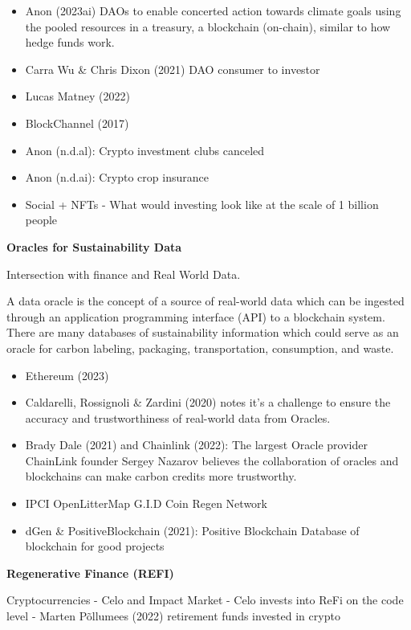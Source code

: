 \documentclass[
  letterpaper,
  DIV=11,
  numbers=noendperiod]{scrartcl}
\begin{document}
\begin{itemize}
\item
  Anon (2023ai) DAOs to enable concerted action towards climate goals
  using the pooled resources in a treasury, a blockchain (on-chain),
  similar to how hedge funds work.
\item
  Carra Wu \& Chris Dixon (2021) DAO consumer to investor
\item
  Lucas Matney (2022)
\item
  BlockChannel (2017)
\item
  Anon (n.d.al): Crypto investment clubs canceled
\item
  Anon (n.d.ai): Crypto crop insurance
\item
  Social + NFTs - What would investing look like at the scale of 1
  billion people
\end{itemize}

\textbf{Oracles for Sustainability Data}

Intersection with finance and Real World Data.

A data oracle is the concept of a source of real-world data which can be
ingested through an application programming interface (API) to a
blockchain system. There are many databases of sustainability
information which could serve as an oracle for carbon labeling,
packaging, transportation, consumption, and waste.

\begin{itemize}
\item
  Ethereum (2023)
\item
  Caldarelli, Rossignoli \& Zardini (2020) notes it's a challenge to
  ensure the accuracy and trustworthiness of real-world data from
  Oracles.
\item
  Brady Dale (2021) and Chainlink (2022): The largest Oracle provider
  ChainLink founder Sergey Nazarov believes the collaboration of oracles
  and blockchains can make carbon credits more trustworthy.
\item
  IPCI OpenLitterMap G.I.D Coin Regen Network
\item
  dGen \& PositiveBlockchain (2021): Positive Blockchain Database of
  blockchain for good projects
\end{itemize}

\textbf{Regenerative Finance (REFI)}

Cryptocurrencies - Celo and Impact Market - Celo invests into ReFi on
the code level - Marten Põllumees (2022) retirement funds invested in
crypto
\end{document}
